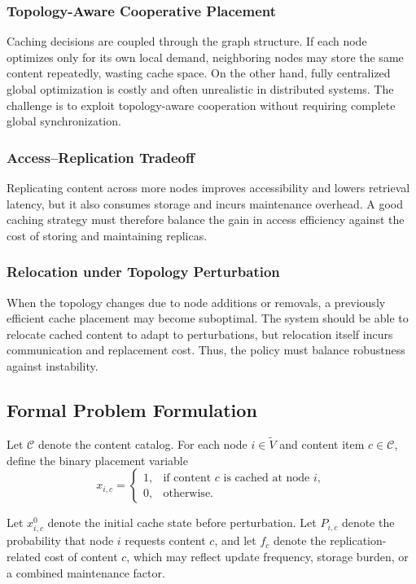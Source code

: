 \subsubsection{Topology-Aware Cooperative Placement}
Caching decisions are coupled through the graph structure. If each node optimizes only for its own local demand, neighboring nodes may store the same content repeatedly, wasting cache space. On the other hand, fully centralized global optimization is costly and often unrealistic in distributed systems. The challenge is to exploit topology-aware cooperation without requiring complete global synchronization.

\subsubsection{Access--Replication Tradeoff}
Replicating content across more nodes improves accessibility and lowers retrieval latency, but it also consumes storage and incurs maintenance overhead. A good caching strategy must therefore balance the gain in access efficiency against the cost of storing and maintaining replicas.

\subsubsection{Relocation under Topology Perturbation}
When the topology changes due to node additions or removals, a previously efficient cache placement may become suboptimal. The system should be able to relocate cached content to adapt to perturbations, but relocation itself incurs communication and replacement cost. Thus, the policy must balance robustness against instability.

\subsection{Formal Problem Formulation}

Let \(\mathcal{C}\) denote the content catalog. For each node \(i \in \tilde{V}\) and content item \(c \in \mathcal{C}\), define the binary placement variable
\[
x_{i,c} =
\begin{cases}
1, & \text{if content } c \text{ is cached at node } i,\\
0, & \text{otherwise.}
\end{cases}
\]

Let \(x^{0}_{i,c}\) denote the initial cache state before perturbation. Let \(P_{i,c}\) denote the probability that node \(i\) requests content \(c\), and let \(f_c\) denote the replication-related cost of content \(c\), which may reflect update frequency, storage burden, or a combined maintenance factor.

